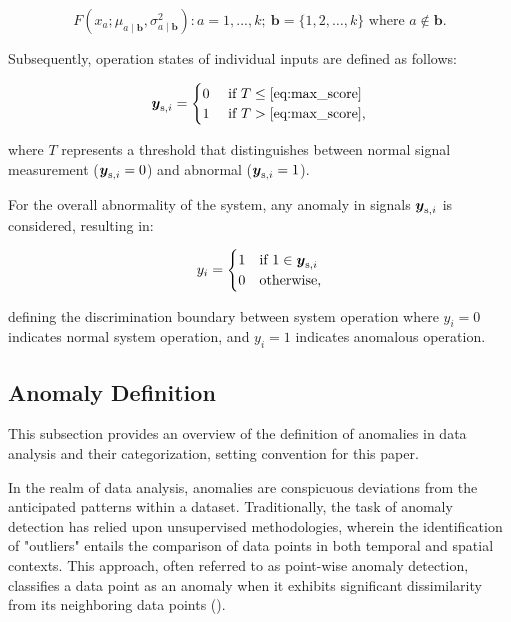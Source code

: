 
\begin{equation}
 {F(x_a; \mu_{a \mid \boldsymbol{b}}, \sigma_{a \mid \boldsymbol{b}}^2)}:a = 1,...,k;~ \boldsymbol{b} = \{1, 2, \ldots, k\} \text{ where }a \notin \boldsymbol{b} \text{.}\label{eq:max_score}
\end{equation}

Subsequently, operation states of individual inputs are defined as follows:

\begin{equation}
 \boldsymbol{y} _{\text{s}, i} =
 \begin{cases}
 0 & \text{ if } T \leq \eqref{eq:max_score}
 \\
 1 & \text{ if } T > \eqref{eq:max_score}
 \text{,}\label{eq:anomaly_signal}
 \end{cases}
\end{equation}

where $T$ represents a threshold that distinguishes between normal signal measurement ($\boldsymbol{y} _{\text{s}, i} = 0$) and abnormal ($\boldsymbol{y} _{\text{s}, i} = 1$).

For the overall abnormality of the system, any anomaly in signals $\boldsymbol{y} _{\text{s}, i}$ is considered, resulting in:

\begin{equation}
 y_i =
 \begin{cases}
 1 & \text{if } 1 \in \boldsymbol{y} _{\text{s}, i}
 \\
 0 & \text{otherwise}
 \text{,}\label{eq:anomaly}
 \end{cases}
\end{equation}


defining the discrimination boundary between system operation where $y_i = 0$ indicates normal system operation, and $y_i = 1$ indicates anomalous operation.

\subsection{Anomaly Definition}\label{AA:AnomalyDefinition}
This subsection provides an overview of the definition of anomalies in data analysis and their categorization, setting convention for this paper.

In the realm of data analysis, anomalies are conspicuous deviations from the anticipated patterns within a dataset. Traditionally, the task of anomaly detection has relied upon unsupervised methodologies, wherein the identification of "outliers" entails the comparison of data points in both temporal and spatial contexts. This approach, often referred to as point-wise anomaly detection, classifies a data point as an anomaly when it exhibits significant dissimilarity from its neighboring data points (\cite{IGLESIASVAZQUEZ2023120994}).

